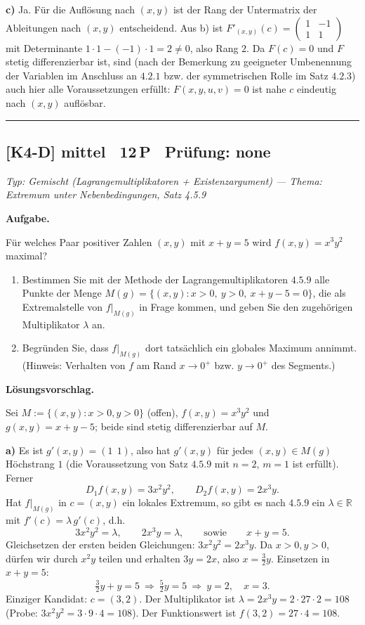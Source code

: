 \documentclass[a4paper,11pt]{article}
\begin{document}
\textbf{c)} Ja. Für die Auflösung nach $(x,y)$ ist der Rang der Untermatrix der Ableitungen nach $(x,y)$ entscheidend. Aus b) ist $F'_{(x,y)}(c)=\begin{pmatrix}1&-1\\1&1\end{pmatrix}$ mit Determinante $1\cdot1-(-1)\cdot1=2\neq0$, also Rang $2$. Da $F(c)=0$ und $F$ stetig differenzierbar ist, sind (nach der Bemerkung zu geeigneter Umbenennung der Variablen im Anschluss an $4.2.1$ bzw. der symmetrischen Rolle im Satz $4.2.3$) auch hier alle Voraussetzungen erfüllt: $F(x,y,u,v)=0$ ist nahe $c$ eindeutig nach $(x,y)$ auflösbar.\par\bigskip\hrule\bigskip
\subsection*{[K4-D] \normalfont mittel \textbullet\ 12\,P \textbullet\ Pr\"ufung: none}
\textit{Typ: Gemischt (Lagrangemultiplikatoren + Existenzargument)  ---  Thema: Extremum unter Nebenbedingungen, Satz 4.5.9}\par\smallskip
\textbf{Aufgabe.}\par
Für welches Paar positiver Zahlen $(x,y)$ mit $x+y=5$ wird $f(x,y)=x^3y^2$ maximal?
\begin{enumerate}[label=\alph*)]
  \item Bestimmen Sie mit der Methode der Lagrangemultiplikatoren $4.5.9$ alle Punkte der Menge $M(g)=\{(x,y): x>0,\ y>0,\ x+y-5=0\}$, die als Extremalstelle von $f|_{M(g)}$ in Frage kommen, und geben Sie den zugehörigen Multiplikator $\lambda$ an.
  \item Begründen Sie, dass $f|_{M(g)}$ dort tatsächlich ein globales Maximum annimmt. (Hinweis: Verhalten von $f$ am \glqq Rand\grqq{} $x\to0^+$ bzw. $y\to0^+$ des Segments.)
\end{enumerate}\par\smallskip
\textbf{L\"osungsvorschlag.}\par
Sei $M:=\{(x,y):x>0,y>0\}$ (offen), $f(x,y)=x^3y^2$ und $g(x,y)=x+y-5$; beide sind stetig differenzierbar auf $M$.

\textbf{a)} Es ist $g'(x,y)=(1\ \ 1)$, also hat $g'(x,y)$ für jedes $(x,y)\in M(g)$ Höchstrang $1$ (die Voraussetzung von Satz $4.5.9$ mit $n=2$, $m=1$ ist erfüllt). Ferner
\[ D_1f(x,y)=3x^2y^2,\qquad D_2f(x,y)=2x^3y. \]
Hat $f|_{M(g)}$ in $c=(x,y)$ ein lokales Extremum, so gibt es nach $4.5.9$ ein $\lambda\in\mathbb{R}$ mit $f'(c)=\lambda\,g'(c)$, d.h.
\[ 3x^2y^2=\lambda,\qquad 2x^3y=\lambda,\qquad\text{sowie}\qquad x+y=5. \]
Gleichsetzen der ersten beiden Gleichungen: $3x^2y^2=2x^3y$. Da $x>0,y>0$, dürfen wir durch $x^2y$ teilen und erhalten $3y=2x$, also $x=\tfrac32 y$. Einsetzen in $x+y=5$:
\[ \tfrac32 y+y=5\ \Rightarrow\ \tfrac52 y=5\ \Rightarrow\ y=2,\quad x=3. \]
Einziger Kandidat: $c=(3,2)$. Der Multiplikator ist $\lambda=2x^3y=2\cdot27\cdot2=108$ (Probe: $3x^2y^2=3\cdot9\cdot4=108$). Der Funktionswert ist $f(3,2)=27\cdot4=108$.
\end{document}
